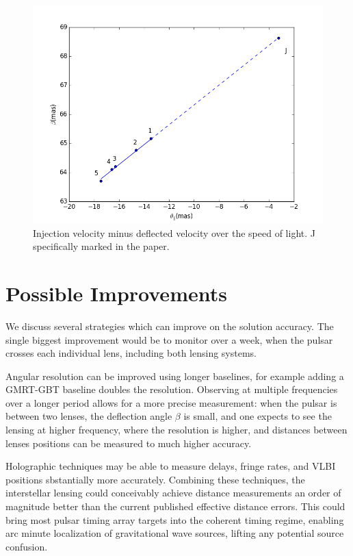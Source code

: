 \documentclass[useAMS,usenatbib]{mn2e}
\begin{document}
\begin{figure}
\centering
\includegraphics[width=1.0\linewidth,angle=0]{Reflection_angle.png}
\caption{Injection velocity minus deflected velocity over the speed of light. J specifically marked in the paper.}
\label{vtrans}
\end{figure}



\section{Possible Improvements}

We discuss several strategies which can improve on the solution
accuracy.  The single biggest improvement would be to monitor over a
week, when the pulsar crosses each individual lens, including both
lensing systems.

Angular resolution can be improved using longer baselines, for example
adding a GMRT-GBT baseline doubles the resolution.  Observing at
multiple frequencies over a longer period allows for a more precise
measurement: when the pulsar is between two lenses, the deflection
angle $\beta$ is small, and one expects to see the lensing at higher
frequency, where the resolution is higher, and distances between
lenses positions can be measured to much higher accuracy.

Holographic techniques \citep{2008MNRAS.388.1214W,2014MNRAS.440L..36P}
may be able to measure delays, fringe rates, and VLBI positions
sbstantially more accurately.  Combining these techniques, the
interstellar lensing could conceivably achieve distance measurements
an order of magnitude better than the current published effective
distance errors.  This could bring most pulsar timing array targets
into the coherent timing regime, enabling arc minute localization of
gravitational wave sources, lifting any potential source confusion.
\end{document}
